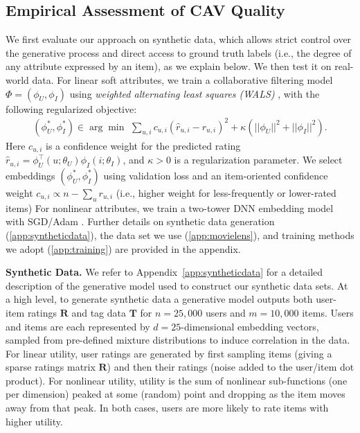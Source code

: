\documentclass[manuscript,screen,nonacm]{acmart}
\newcommand{\1}{{\mathbf 1}}
\newcommand{\bfT}{\mathbf{T}}
\newcommand{\bfR}{\mathbf{R}}
\newcommand{\hatr}{\hat{r}}
\theoremstyle{TheoremNum}
\begin{document}
\subsection{Empirical Assessment of CAV Quality}
\label{sec:empiricalObjective}

We first evaluate our approach on synthetic data, which allows strict control over the generative process and direct access to ground truth labels (i.e., the degree of any attribute expressed by an item), as we explain below. We then test it on real-world data.
For linear soft attributes, we train a collaborative filtering model $\Phi = (\phi_U, \phi_I)$ using \emph{weighted alternating least squares (WALS)}
\cite{wals:icdm08},
with the following regularized objective:
\begin{align}
(\phi^*_U, \phi^*_I)\in\arg\min\,\,\sum_{u,i}c_{u,i}(\hatr_{u,i}-r_{u,i})^2\!+\!\kappa(||\phi_U||^2 \!+\!||\phi_I||^2).
\end{align}
Here $c_{u,i}$ is a confidence weight for the predicted rating $\hatr_{u,i}=\phi^\top_{U}(u;\theta_U) \phi_{I}(i;\theta_I)$, and $\kappa > 0$ is a regularization parameter. We select embeddings $(\phi^*_U, \phi^*_I)$ using validation loss and an item-oriented confidence weight
$c_{u,i}\propto n -\sum_u r_{u,i}$ (i.e., higher weight for less-frequently or lower-rated items) 
For nonlinear attributes, we train a two-tower DNN embedding model with SGD/Adam \cite{adam}.
Further details on synthetic data generation (\ref{app:syntheticdata}), the data set we use (\ref{app:movielens}), and training methods we adopt (\ref{app:training})
are provided in the appendix.

\vskip 2mm
\noindent
\textbf{Synthetic Data.}\hspace*{2mm}
We refer to Appendix~\ref{app:syntheticdata} for a detailed description of the generative model used to construct our synthetic data sets. At a high level,
to generate synthetic data a generative model outputs both user-item ratings $\bfR$ and tag data $\bfT$ for $n = 25,000$ users and $m = 10,000$ items. Users and items are each represented by $d=25$-dimensional embedding vectors,
sampled from pre-defined mixture distributions to induce correlation in the data. For linear utility, user ratings are generated by first sampling items (giving a sparse ratings matrix $\bfR$) and then their ratings (noise added to the user/item dot product). For nonlinear utility, utility is the sum of nonlinear sub-functions (one per dimension) peaked at some (random) point and dropping
as the item moves away from that peak.
In both cases, users 
are more likely
to rate items with higher utility.
\end{document}
